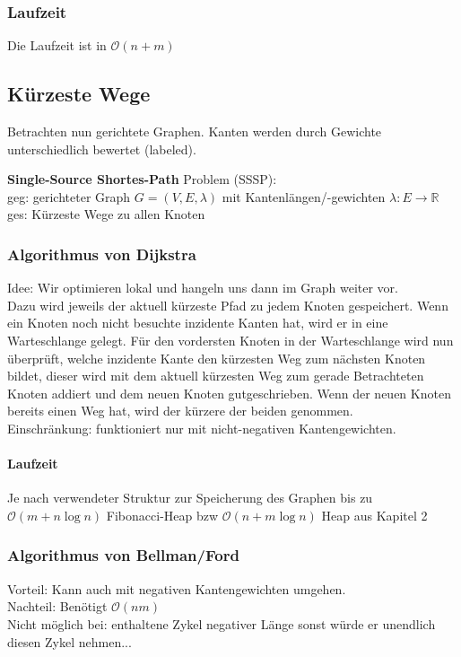 \documentclass{scrartcl}
\begin{document}
\subsubsection{Laufzeit}
Die Laufzeit ist in $\mathcal{O}(n+m)$

\subsection{Kürzeste Wege}
Betrachten nun gerichtete Graphen. Kanten werden durch Gewichte unterschiedlich bewertet (labeled). \\
\begin{shaded}
\textbf{Single-Source Shortes-Path} Problem {\tiny (SSSP)}:\\
geg: gerichteter Graph $G=(V,E,\lambda)$ mit Kantenlängen/-gewichten $\lambda:E\to\mathds{R}$\\
ges: Kürzeste Wege zu allen Knoten
\end{shaded}

\subsubsection{Algorithmus von \textbf{Dijkstra}}
Idee: Wir optimieren lokal und hangeln uns dann im Graph weiter vor.\\
Dazu wird jeweils der aktuell kürzeste Pfad zu jedem Knoten gespeichert. Wenn ein Knoten noch nicht besuchte inzidente Kanten hat, wird er in eine Warteschlange gelegt. Für den vordersten Knoten in der Warteschlange wird nun überprüft, welche inzidente Kante den kürzesten Weg zum nächsten Knoten bildet, dieser wird mit dem aktuell kürzesten Weg zum gerade Betrachteten Knoten addiert und dem neuen Knoten gutgeschrieben. Wenn der neuen Knoten bereits einen Weg hat, wird der kürzere der beiden genommen.\\ Einschränkung: funktioniert nur mit nicht-negativen Kantengewichten.
\paragraph{Laufzeit} Je nach verwendeter Struktur zur Speicherung des Graphen bis zu $\mathcal{O}(m+n\log n)$ {\tiny Fibonacci-Heap} bzw $\mathcal{O}(n+m\log n)$ {\tiny Heap aus Kapitel 2}

\subsubsection{Algorithmus von \textbf{Bellman/Ford}}
Vorteil: Kann auch mit negativen Kantengewichten umgehen.\\
Nachteil: Benötigt $\mathcal{O}(nm)$ \\
Nicht möglich bei: enthaltene Zykel negativer Länge {\tiny sonst würde er unendlich diesen Zykel nehmen...}
\end{document}
